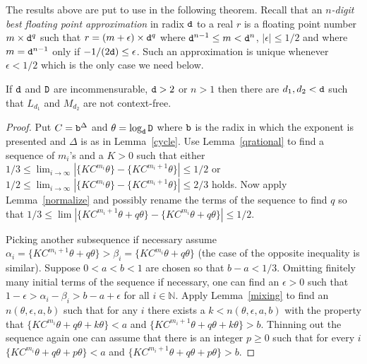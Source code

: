 \documentclass[12pt]{article}
\begin{document}
The results above are put to use in the following theorem. Recall that
an {\it $n$-digit best floating point approximation\/} in radix $\ttd$ to a real $r$ is a
floating point number $m\times{\tt d}^q$ such that
$r=(m+\epsilon)\times{\tt d}^q$ where ${\tt d}^{n-1}\leq m<{\tt d}^n$, $|\epsilon|\leq1/2$ and where
$m={\tt d}^{n-1}$ only if $-1/(2{\tt d})\leq\epsilon$. Such an approximation
is unique whenever $\epsilon<1/2$ which is the only case we need below.
\begin{theorem}\label{pdacs}
If $\ttd$ and ${\tt D}$ are incommensurable, ${\tt d}>2$ or $n>1$ 
then there are $d_1,d_2<{\tt d}$ such that $L_{d_1}$ and
$M_{d_2}$ are not context-free.
\end{theorem}
\begin{proof}
Put $C={\tt b}^\Delta$ and $\theta=\log_{\tt d}{\tt D}$ where ${\tt b}$ is the radix in which the exponent is
presented and $\Delta$ is as in Lemma~\ref{cycle}. Use
Lemma~\ref{qrational} to find a sequence of $m_i$'s and a $K>0$ such
that either $1/3\leq\lim_{i\to\infty}|\{KC^{m_i}\theta\}-\{KC^{m_i+1}\theta\}|\leq1/2$ or
$1/2\leq\lim_{i\to\infty}|\{KC^{m_i}\theta\}-\{KC^{m_i+1}\theta\}|\leq2/3$
holds. Now apply Lemma~\ref{normalize} and possibly rename the terms
of the sequence to find $q$ so that 
$1/3\leq\lim|\{KC^{m_i+1}\theta+q\theta\}-\{KC^{m_i}\theta+q\theta\}|\leq1/2$.

Picking another subsequence if necessary assume
$\alpha_i=\{KC^{m_i+1}\theta+q\theta\}>\beta_i=\{KC^{m_i}\theta+q\theta\}$ 
(the case of the opposite inequality is similar).
Suppose $0<a<b<1$ are chosen so that $b-a<1/3$. Omitting finitely many initial
terms of the sequence if necessary, one can find an $\epsilon>0$ such
that $1-\epsilon>\alpha_i-\beta_i>b-a+\epsilon$ for all
$i\in\mathbb N$. Apply Lemma~\ref{mixing} to find an
$n(\theta,\epsilon,a,b)$ such that for any $i$ there exists a
$k<n(\theta,\epsilon,a,b)$ with the property that 
$\{KC^{m_i}\theta+q\theta+k\theta\}<a$ and
$\{KC^{m_i+1}\theta+q\theta+k\theta\}>b$. Thinning out the
sequence again one can assume that there is an integer $p\geq0$ such
that for every $i$ $\{KC^{m_i}\theta+q\theta+p\theta\}<a$ and
$\{KC^{m_i+1}\theta+q\theta+p\theta\}>b$.
 
\iffalse Let $u$ be the ${\ttb}$-digits of $p+q$, and $w$ be
the ${\ttb}$-digits of $K$. Use Lemma~\ref{cycle} to find $n_0$ and $n_1$ then pick $m_i$
large enough so that $m_i>n_0$, and $m_i$ satisfies an additional
property mentioned below.
Lemma~\ref{cycle} implies that both 
$$
u{\tt 0}\{n_1+(m_i-n_0)\Delta\}w=\mbox{``$\ttb$-digits of $q+p$''}\mbox{\tt
  0}\{(m_i+1)\Delta-|u|\}\mbox{``$\ttb$-digits of $K$''}
$$ and 
$$
u{\tt 0}\{n_1+(m_i+1-n_0)\Delta\}w=\mbox{``$\ttb$-digits of $q+p$''}\mbox{\tt
  0}\{m_i\Delta-|u|\}\mbox{``$\ttb$-digits of $K$''}
$$ are in the same
$L_d$ (or $M_d$ after the strings
have been reversed accordingly and the remark after Lemma~\ref{cycle}
has been 
applied). Thus the $\ttd$-significands of $\ttD^{K\ttb^{(m_i+1)\Delta}+q+p}$
and $\ttD^{K\ttb^{m_i\Delta}+q+p}$ are the same. 
\fi 


\end{proof}
\end{document}
